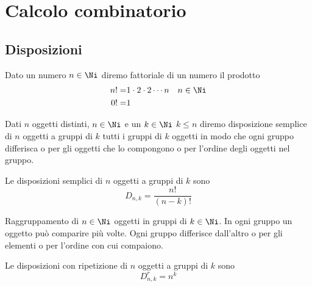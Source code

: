 \chapter{Calcolo combinatorio}\label{ch:calcolo-combinatorio}
\section{Disposizioni}\label{sec:fattoriale}
\begin{defn}\label{defn:Fattoriale-num}
Dato un numero $n\in\Ni$ diremo fattoriale di un numero il prodotto	
\begin{align*}
n!=&1\cdot 2\cdot 2\cdots n&&n\in\Ni\\
0!=&1\\
\end{align*}
\end{defn}
\begin{defn}\label{defn:Diposizioni-semplici}
	Dati $n$ oggetti distinti, $n\in\Ni$ e un $k\in\Ni$ $k\leqslant n$ diremo disposizione semplice di $n$ oggetti a gruppi di $k$ tutti i gruppi di $k$ oggetti in modo che ogni gruppo differisca o per gli oggetti che lo compongono o per l'ordine degli oggetti nel gruppo.
\end{defn}
\begin{thm}
Le disposizioni semplici di $n$ oggetti a gruppi di $k$ sono\[
D_{n,k}=\dfrac{n!}{(n-k)!}\]
\end{thm}
\begin{defn}\label{defn:Diposizioni-ripetizione}
	Raggruppamento di $n\in\Ni$ oggetti in gruppi di $k\in\Ni$. In ogni gruppo un oggetto può comparire più volte. Ogni gruppo differisce dall'altro o per gli elementi o per l'ordine con cui compaiono. 
\end{defn}
\begin{thm}
	Le disposizioni con ripetizione di $n$ oggetti a gruppi di $k$ sono\[
	D^{r}_{n,k}=n^k\]
\end{thm}